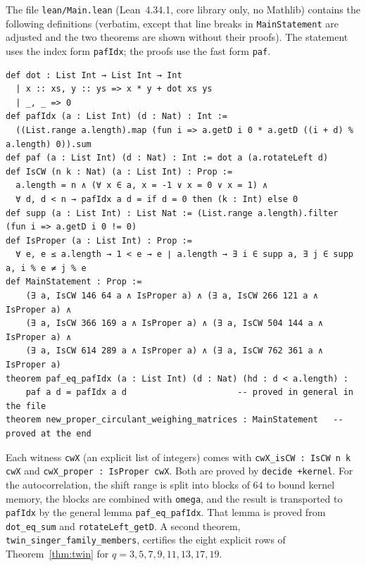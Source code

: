 \documentclass[11pt]{article}
\numberwithin{equation}{section}
\theoremstyle{definition}
\theoremstyle{remark}
\begin{document}
The file \texttt{lean/Main.lean} (Lean~4.34.1, core library only, no Mathlib) contains the
following definitions (verbatim, except that line breaks in \texttt{MainStatement} are adjusted and
the two theorems are shown without their proofs). The statement uses the index form
\texttt{pafIdx}; the proofs use the fast form \texttt{paf}.
\begin{lstlisting}
def dot : List Int → List Int → Int
  | x :: xs, y :: ys => x * y + dot xs ys
  | _, _ => 0
def pafIdx (a : List Int) (d : Nat) : Int :=
  ((List.range a.length).map (fun i => a.getD i 0 * a.getD ((i + d) % a.length) 0)).sum
def paf (a : List Int) (d : Nat) : Int := dot a (a.rotateLeft d)
def IsCW (n k : Nat) (a : List Int) : Prop :=
  a.length = n ∧ (∀ x ∈ a, x = -1 ∨ x = 0 ∨ x = 1) ∧
  ∀ d, d < n → pafIdx a d = if d = 0 then (k : Int) else 0
def supp (a : List Int) : List Nat := (List.range a.length).filter (fun i => a.getD i 0 != 0)
def IsProper (a : List Int) : Prop :=
  ∀ e, e ≤ a.length → 1 < e → e ∣ a.length → ∃ i ∈ supp a, ∃ j ∈ supp a, i % e ≠ j % e
def MainStatement : Prop :=
    (∃ a, IsCW 146 64 a ∧ IsProper a) ∧ (∃ a, IsCW 266 121 a ∧ IsProper a) ∧
    (∃ a, IsCW 366 169 a ∧ IsProper a) ∧ (∃ a, IsCW 504 144 a ∧ IsProper a) ∧
    (∃ a, IsCW 614 289 a ∧ IsProper a) ∧ (∃ a, IsCW 762 361 a ∧ IsProper a)
theorem paf_eq_pafIdx (a : List Int) (d : Nat) (hd : d < a.length) :
    paf a d = pafIdx a d                      -- proved in general in the file
theorem new_proper_circulant_weighing_matrices : MainStatement   -- proved at the end
\end{lstlisting}
{\sloppy Each witness \texttt{cwX} (an explicit list of integers) comes with
\texttt{cwX\_isCW : IsCW n k cwX} and \texttt{cwX\_proper : IsProper cwX}. Both are proved by
\texttt{decide +kernel}. For the autocorrelation, the shift range is split into blocks of $64$
to bound kernel memory, the blocks are combined with \texttt{omega}, and the result is transported
to \texttt{pafIdx} by the general lemma \texttt{paf\_eq\_pafIdx}. That lemma is proved from
\texttt{dot\_eq\_sum} and \texttt{rotateLeft\_getD}. A second theorem,
\texttt{twin\_singer\_family\_members}, certifies the eight explicit rows of
Theorem~\ref{thm:twin} for $q=3,5,7,9,11,13,17,19$.\par}
\end{document}
